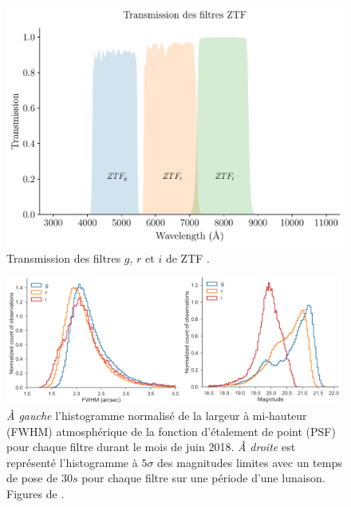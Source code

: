 \documentclass[../main/main.tex]{subfiles}
\begin{document}
\begin{figure}[ht]
  \begin{minipage}[c]{0.55\textwidth}
    \includegraphics[width=\textwidth]{../figures/02_ztf/ZTFfilters.pdf}
  \end{minipage}\hfill
  \begin{minipage}[c]{0.45\textwidth}
    \caption[Transmission des filtres $g$, $r$ et $i$ de
    ZTF]{Transmission des filtres $g$, $r$ et $i$ de ZTF \citep{DekanyZTF2020}.}\label{fig:ztffilters}
  \end{minipage}
\end{figure}



\begin{figure}[h]
  \centering
  \includegraphics[width=0.99\textwidth]{../figures/02_ztf/ztfperformances.pdf}
  \caption[Profondeurs et FWHM associées aux filtres de la caméra
  ZTF]{\textit{À gauche} l'histogramme
    normalisé de la largeur à mi-hauteur (FWHM) atmosphérique de la fonction
    d'étalement de point (PSF) pour chaque filtre durant le mois de juin
    2018. \textit{À droite} est représenté
    l'histogramme à $5\sigma$ des magnitudes limites avec un temps de
    pose de $30s$ pour chaque filtre sur une période d'une
    lunaison. Figures de \citet{BellmZTF2019}.}
  \label{fig:ztfperffilts}
\end{figure}
\end{document}
